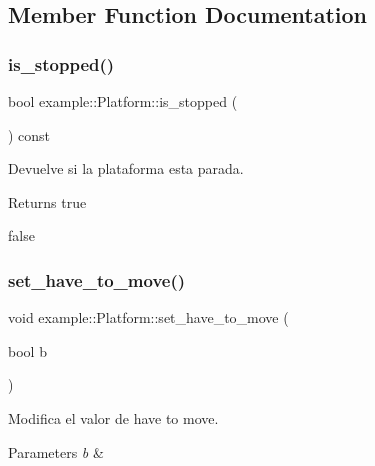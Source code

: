 \subsection{Member Function Documentation}
\mbox{\label{classexample_1_1_platform_a9e3f17752c041210ef9d4b21bf6e2001}} 
\subsubsection{\texorpdfstring{is\_stopped()}{is\_stopped()}}
{\footnotesize\ttfamily bool example\+::\+Platform\+::is\+\_\+stopped (\begin{DoxyParamCaption}{ }\end{DoxyParamCaption}) const\hspace{0.3cm}{\ttfamily [inline]}}



Devuelve si la plataforma esta parada. 

\begin{DoxyReturn}{Returns}
true 

false 
\end{DoxyReturn}
\mbox{\label{classexample_1_1_platform_a8937b48574c62d1d9c3ccde8afad8d47}} 
\subsubsection{\texorpdfstring{set\_have\_to\_move()}{set\_have\_to\_move()}}
{\footnotesize\ttfamily void example\+::\+Platform\+::set\+\_\+have\+\_\+to\+\_\+move (\begin{DoxyParamCaption}\item[{bool}]{b }\end{DoxyParamCaption})}



Modifica el valor de have to move. 


\begin{DoxyParams}{Parameters}
{\em b} & \\
\hline
\end{DoxyParams}
\mbox{\label{classexample_1_1_platform_a70a40dddbd963080b45d086f79c88b3e}} 
